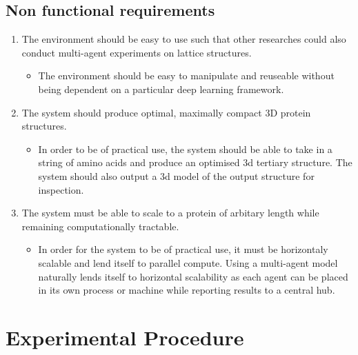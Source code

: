 \subsection{Non functional requirements}
\begin{enumerate}
    \item The environment should be easy to use such that other researches could also conduct multi-agent
    experiments on lattice structures.
    \begin{itemize}
        \item The environment should be easy to manipulate and reuseable without being dependent on a particular
        deep learning framework.
    \end{itemize}
    \item The system should produce optimal, maximally compact 3D protein structures.
    \begin{itemize}
        \item In order to be of practical use, the system should be able to take in a string of amino acids
        and produce an optimised 3d tertiary structure. The system should also output a 3d model of the output structure
        for inspection.
    \end{itemize}
    \item The system must be able to scale to a protein of arbitary length while remaining computationally tractable.
    \begin{itemize}
        \item In order for the system to be of practical use, it must be horizontaly scalable and lend itself
        to parallel compute. Using a multi-agent model naturally lends itself to horizontal scalability
        as each agent can be placed in its own process or machine while reporting results to a central hub.
    \end{itemize}
\end{enumerate}
\section{Experimental Procedure}
